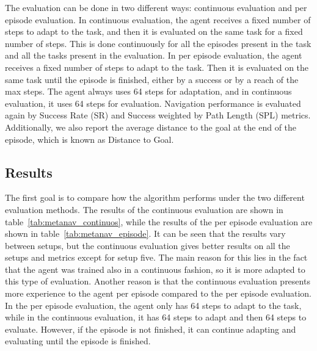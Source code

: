 The evaluation can be done in two different ways: continuous evaluation and per episode evaluation.
In continuous evaluation, the agent receives a fixed number of steps to adapt to the task, and then it is evaluated on the same task for a fixed number of steps.
This is done continuously for all the episodes present in the task and all the tasks present in the evaluation.
In per episode evaluation, the agent receives a fixed number of steps to adapt to the task.
Then it is evaluated on the same task until the episode is finished, either by a success or by a reach of the max steps.
The agent always uses 64 steps for adaptation, and in continuous evaluation, it uses 64 steps for evaluation.
Navigation performance is evaluated again by Success Rate (SR) and Success weighted by Path Length (SPL) metrics.
Additionally, we also report the average distance to the goal at the end of the episode, which is known as Distance to Goal.

\subsection{Results}\label{subsec:results_metanav}

The first goal is to compare how the algorithm performs under the two different evaluation methods.
The results of the continuous evaluation are shown in table~\ref{tab:metanav_continuos}, while the results of the per episode evaluation are shown in table~\ref{tab:metanav_episode}.
It can be seen that the results vary between setups, but the continuous evaluation gives better results on all the setups and metrics except for setup five.
The main reason for this lies in the fact that the agent was trained also in a continuous fashion, so it is more adapted to this type of evaluation.
Another reason is that the continuous evaluation presents more experience to the agent per episode compared to the per episode evaluation.
In the per episode evaluation, the agent only has 64 steps to adapt to the task, while in the continuous evaluation, it has 64 steps to adapt and then 64 steps to evaluate.
However, if the episode is not finished, it can continue adapting and evaluating until the episode is finished.

